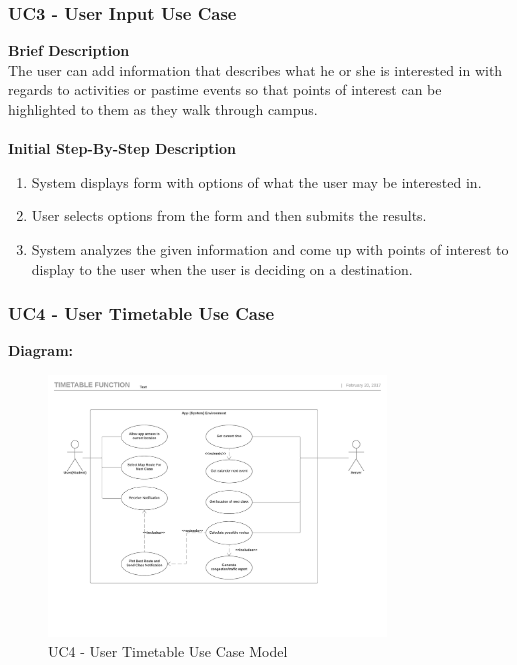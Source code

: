\documentclass[a4paper, 12pt, one column, aas_macros]{article}
\begin{document}
\clearpage
\subsubsection{ UC3 - User Input Use Case}
\textbf{Brief Description}\\
The user can add information that describes what he or she is interested in with regards to activities or pastime events so that points of interest can be highlighted to them as they walk through campus. \\
\\\textbf{Initial Step-By-Step Description}\\
\begin{enumerate}
\item System displays form with options of what the user may be interested in.
\item User selects options from the form and then submits the results.
\item System analyzes the given information and come up with points of interest to display to the user when the user is deciding on a destination.
\end{enumerate}


\subsubsection{UC4 - User Timetable Use Case}
\textbf{Diagram:}
\begin{figure}[H]
\centering
\includegraphics[width=0.8\textwidth]{Time_Table_Use-Case.pdf}
\caption{UC4 - User Timetable Use Case Model}
\end{figure}
\end{document}
